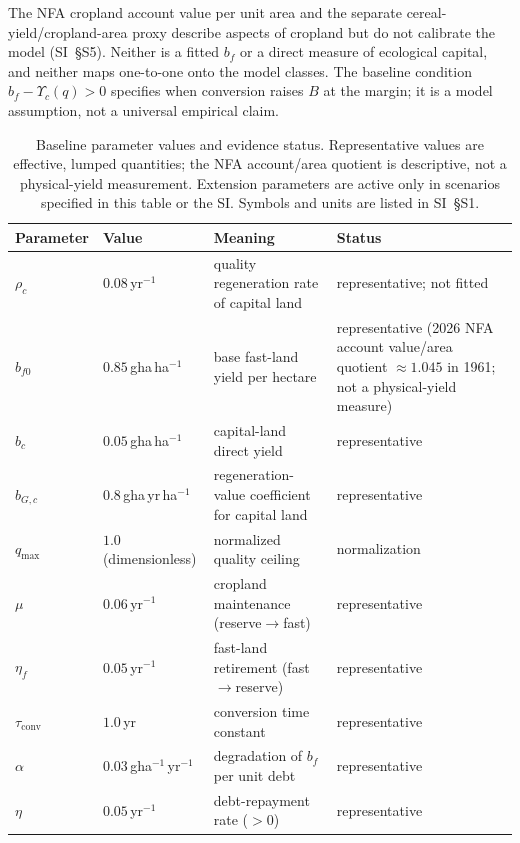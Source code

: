 \documentclass[preprint,12pt,authoryear]{elsarticle}
\newcommand{\Ups}{\Upsilon_c}
\newcommand{\tconv}{\tau_{\mathrm{conv}}}
\begin{document}
The NFA cropland account value per unit area and the separate cereal-yield/cropland-area proxy describe aspects of cropland but do not calibrate the model (SI~\S S5). Neither is a fitted $b_f$ or a direct measure of ecological capital, and neither maps one-to-one onto the model classes. The baseline condition $b_f-\Ups(q)>0$ specifies when conversion raises $B$ at the margin; it is a model assumption, not a universal empirical claim.

\begin{table}[!htbp]
\centering\footnotesize
\renewcommand{\arraystretch}{0.95}
\caption{Baseline parameter values and evidence status. Representative values are effective, lumped quantities; the NFA account/area quotient is descriptive, not a physical-yield measurement. Extension parameters are active only in scenarios specified in this table or the SI. Symbols and units are listed in SI~\S S1.}
\label{tab:params}
\setlength{\tabcolsep}{4pt}
\begin{tabularx}{\textwidth}{@{}>{\raggedright\arraybackslash}p{} >{\raggedright\arraybackslash}p{} >{\raggedright\arraybackslash}X >{\raggedright\arraybackslash}p{}@{}}
\toprule
Parameter & Value & Meaning & Status \\
\midrule
$\rho_c$ & $0.08$\,yr$^{-1}$ & quality regeneration rate of capital land & representative; not fitted \\
$b_{f0}$ & $0.85$\,gha\,ha$^{-1}$ & base fast-land yield per hectare & representative (2026 NFA account value/area quotient $\approx1.045$ in 1961; not a physical-yield measure) \\
$b_c$ & $0.05$\,gha\,ha$^{-1}$ & capital-land direct yield & representative \\
$b_{G,c}$ & $0.8$\,gha\,yr\,ha$^{-1}$ & regeneration-value coefficient for capital land & representative \\
$q_{\max}$ & $1.0$ (dimensionless) & normalized quality ceiling & normalization \\
$\mu$ & $0.06$\,yr$^{-1}$ & cropland maintenance (reserve$\to$fast) & representative \\
$\eta_f$ & $0.05$\,yr$^{-1}$ & fast-land retirement (fast$\to$reserve) & representative \\
$\tconv$ & $1.0$\,yr & conversion time constant & representative \\
$\alpha$ & $0.03$\,gha$^{-1}$\,yr$^{-1}$ & degradation of $b_f$ per unit debt & representative \\
$\eta$ & $0.05$\,yr$^{-1}$ & debt-repayment rate ($>0$) & representative \\

\end{tabularx}
\end{table}
\end{document}
